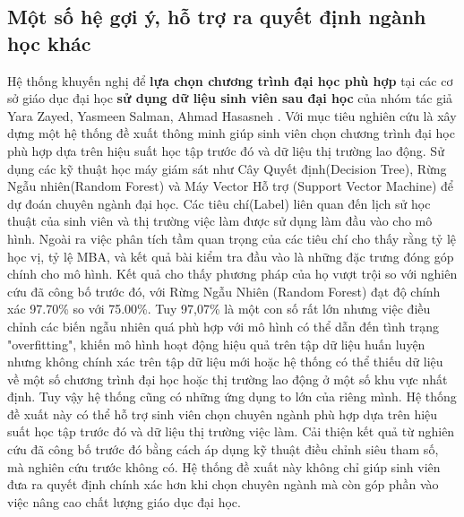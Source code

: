 \subsection{Một số hệ gợi ý, hỗ trợ ra quyết định ngành học khác}
Hệ thống khuyến nghị để \textbf{lựa chọn chương trình đại học phù hợp} tại các cơ sở giáo dục đại học \textbf{sử dụng dữ liệu sinh viên sau đại học} của nhóm tác giả Yara Zayed, Yasmeen Salman, Ahmad Hasasneh \cite{yara}. Với mục tiêu nghiên cứu là  xây dựng một hệ thống đề xuất thông minh giúp sinh viên chọn chương trình đại học phù hợp dựa trên hiệu suất học tập trước đó và dữ liệu thị trường lao động. Sử dụng các kỹ thuật học máy giám sát như Cây Quyết định(Decision Tree), Rừng Ngẫu nhiên(Random Forest) và Máy Vector Hỗ trợ (Support Vector Machine) để dự đoán chuyên ngành đại học. Các tiêu chí(Label) liên quan đến lịch sử học thuật của sinh viên và thị trường việc làm được sử dụng làm đầu vào cho mô hình. Ngoài ra việc phân tích tầm quan trọng của các tiêu chí cho thấy rằng tỷ lệ học vị, tỷ lệ MBA, và kết quả bài kiểm tra đầu vào là những đặc trưng đóng góp chính cho mô hình. Kết quả cho thấy phương pháp của họ vượt trội so với nghiên cứu đã công bố trước đó, với Rừng Ngẫu Nhiên (Random Forest) đạt độ chính xác 97.70\% so với 75.00\%. Tuy 97,07\% là một con số rất lớn nhưng việc điều chỉnh các biến ngẫu nhiên quá phù hợp với mô hình có thể dẫn đến tình trạng "overfitting", khiến mô hình hoạt động hiệu quả trên tập dữ liệu huấn luyện nhưng không chính xác trên tập dữ liệu mới hoặc hệ thống có thể thiếu dữ liệu về một số chương trình đại học hoặc thị trường lao động ở một số khu vực nhất định. Tuy vậy hệ thống cũng có những ứng dụng to lớn của riêng mình. Hệ thống đề xuất này có thể hỗ trợ sinh viên chọn chuyên ngành phù hợp dựa trên hiệu suất học tập trước đó và dữ liệu thị trường việc làm. Cải thiện kết quả từ nghiên cứu đã công bố trước đó bằng cách áp dụng kỹ thuật điều chỉnh siêu tham số, mà nghiên cứu trước không có. Hệ thống đề xuất này không chỉ giúp sinh viên đưa ra quyết định chính xác hơn khi chọn chuyên ngành mà còn góp phần vào việc nâng cao chất lượng giáo dục đại học.

